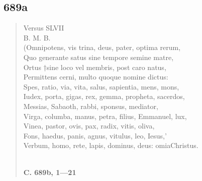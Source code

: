 \documentclass[11pt, a4paper]{report}
\begin{document}
            \subsection*{689a}
      \begin{verse}
      Versus SLVII \\ B. M. B. \\ (Omnipotens, vis trina, deus, pater, optima rerum, \\ Quo generante satus sine tempore semine matre, \\ Ortus †sine loco vel membris, post caro natus, \\ Permittens cerni, multo quoque nomine dictus: \\ Spes, ratio, via, vita, salus, sapientia, mens, mons, \\ Iudex, porta, gigas, rex, gemma, propheta, sacerdos, \\ Messias, Sabaoth, rabbi, sponsus, mediator, \\ Virga, columba, manus, petra, filius, Emmanuel, lux, \\ Vinea, pastor, ovis, pax, radix, vitis, oliva, \\ Fons, haedus, panis, agnus, vitulus, leo, Iesus,’ \\ Verbum, homo, rete, lapis, dominus, deus: omiaChristus. \\ 
        ﻿\pagebreak 
    \begin{center} \textbf{C. 689b, 1—21} \end{center} \marginpar{[163]} 
      \end{verse}
  
\end{document}
